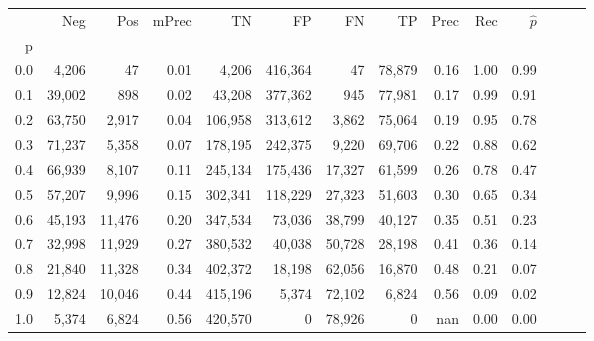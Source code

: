 \begin{tabular}{rrrrrrrrrrrrrr}
\toprule
{} &     Neg &     Pos & mPrec &       TN &       FP &      FN &      TP &  Prec &   Rec & $\hat{p}$ \\
p   &         &         &       &          &          &         &         &       &       &           \\
\midrule
0.0 &   4,206 &      47 &  0.01 &    4,206 &  416,364 &      47 &  78,879 &  0.16 &  1.00 &      0.99 \\
0.1 &  39,002 &     898 &  0.02 &   43,208 &  377,362 &     945 &  77,981 &  0.17 &  0.99 &      0.91 \\
0.2 &  63,750 &   2,917 &  0.04 &  106,958 &  313,612 &   3,862 &  75,064 &  0.19 &  0.95 &      0.78 \\
0.3 &  71,237 &   5,358 &  0.07 &  178,195 &  242,375 &   9,220 &  69,706 &  0.22 &  0.88 &      0.62 \\
0.4 &  66,939 &   8,107 &  0.11 &  245,134 &  175,436 &  17,327 &  61,599 &  0.26 &  0.78 &      0.47 \\
0.5 &  57,207 &   9,996 &  0.15 &  302,341 &  118,229 &  27,323 &  51,603 &  0.30 &  0.65 &      0.34 \\
0.6 &  45,193 &  11,476 &  0.20 &  347,534 &   73,036 &  38,799 &  40,127 &  0.35 &  0.51 &      0.23 \\
0.7 &  32,998 &  11,929 &  0.27 &  380,532 &   40,038 &  50,728 &  28,198 &  0.41 &  0.36 &      0.14 \\
0.8 &  21,840 &  11,328 &  0.34 &  402,372 &   18,198 &  62,056 &  16,870 &  0.48 &  0.21 &      0.07 \\
0.9 &  12,824 &  10,046 &  0.44 &  415,196 &    5,374 &  72,102 &   6,824 &  0.56 &  0.09 &      0.02 \\
1.0 &   5,374 &   6,824 &  0.56 &  420,570 &        0 &  78,926 &       0 &   nan &  0.00 &      0.00 \\
\bottomrule
\end{tabular}
